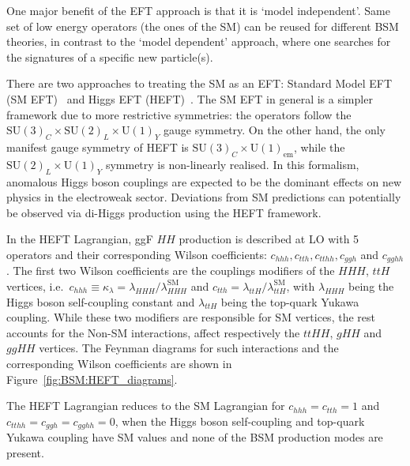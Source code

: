 One major benefit of the EFT approach is that it is `model independent'.
Same set of low energy operators (the ones of the SM) can be reused for different 
BSM theories, in contrast to the `model dependent' approach, 
where one searches for the signatures of a specific new particle(s). 

There are two approaches to treating the SM as an EFT:
Standard Model EFT (SM EFT)~\cite{EFT-dimension-6} and Higgs EFT (HEFT)~\cite{HEFT1, HEFT2}.
The SM EFT in general is a simpler framework due to more restrictive symmetries:
the operators follow the $\text{SU}(3)_C \times \text{SU}(2)_L\times \text{U}(1)_Y$ gauge symmetry.
On the other hand, the only manifest gauge symmetry of 
HEFT is $\text{SU}(3)_C \times \text{U}(1)_{\text{em}}$,
while the  $\text{SU}(2)_L\times \text{U}(1)_Y$ symmetry is non-linearly realised.
In this formalism, anomalous Higgs boson couplings are expected to be the 
dominant effects on new physics in the electroweak sector. 
Deviations from SM predictions can potentially be observed via 
di-Higgs production using the HEFT framework.

In the HEFT Lagrangian, ggF $HH$ production is described at LO with 
5 operators and their corresponding Wilson coefficients: $c_{hhh}, c_{tth}, c_{tthh}, c_{ggh}$ 
and $c_{gghh}$. 
The first two Wilson coefficients are the couplings modifiers 
of the $HHH$, $ttH$ vertices, 
i.e.\  $c_{hhh} \equiv \kappa_\lambda =  \lambda_{HHH} / \lambda^{\text{SM}}_{HHH}$ and 
$c_{tth}  = \lambda_{ttH} / \lambda^{\text{SM}}_{ttH}$,
with $\lambda_{HHH}$ being the Higgs boson self-coupling constant 
and $\lambda_{ttH}$ being the top-quark Yukawa coupling. 
While these two modifiers are responsible for SM vertices,
the rest accounts for the Non-SM interactions,
affect respectively the $ttHH$, $gHH$ and $ggHH$ vertices. 
The Feynman diagrams for such interactions and the corresponding
Wilson coefficients are shown in Figure~\ref{fig:BSM:HEFT_diagrams}.

The HEFT Lagrangian reduces to the SM Lagrangian for $c_{hhh} = c_{tth} = 1$ 
and $c_{tthh} = c_{ggh} = c_{gghh} = 0$, when the Higgs boson self-coupling 
and top-quark Yukawa coupling have SM values 
and none of the BSM production modes are present. 

